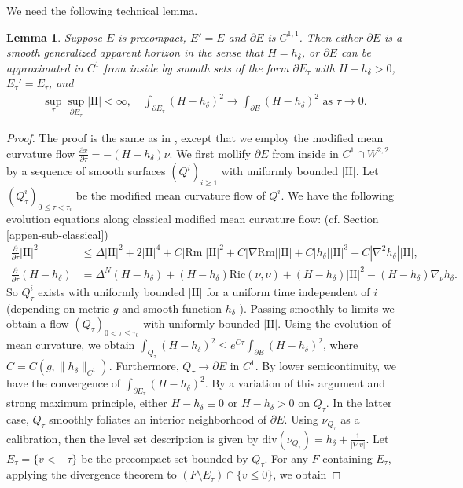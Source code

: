 \documentclass[11pt, letterpaper]{amsart}
\newtheorem{lem}[thm]{Lemma}
\theoremstyle{definition}
\theoremstyle{remark}
\begin{document}
We need the following technical lemma.
\begin{lem}\label{modified-mcf-smoothing}
Suppose $E$ is precompact, $E' = E$ and $\partial E$ is $C^{1,1}$. Then either $\partial E$ is a smooth generalized apparent horizon in the sense that $H= h_{\delta }$, or $\partial E$ can be approximated in $C^1$ from inside by smooth sets of the form $\partial E_{\tau }$ with $H- h_{\delta }>0$, $E_{\tau }' = E_{\tau }$, and
\begin{align*}
	\sup_{\tau } \sup_{\partial E_{\tau }} |\mathrm{II}| < \infty,\quad \int_{\partial E_{\tau }} (H- h_{\delta })^2 \to \int_{\partial E} (H- h_{\delta })^2 \text{ as } \tau \to 0.
\end{align*} 
\end{lem}
\begin{proof}
	The proof is the same as in \cite[Lemma 5.6]{HI01}, except that we employ the modified mean curvature flow $\frac{\partial x}{\partial \tau } = - (H- h_{\delta }) \nu $. We first mollify $\partial E$ from inside in $C^{1}\cap W^{2,2}$ by a sequence of smooth surfaces $(Q^{i})_{i \geq 1}$ with uniformly bounded $|\mathrm{II}|$. Let $(Q ^{i}_{\tau })_{0 \leq \tau < \tau _i}$ be the modified mean curvature flow of $Q^i$.  We have the following evolution equations along classical modified mean curvature flow: (cf. Section \ref{appen-sub-classical})
	\begin{align*}
		\frac{\partial }{\partial \tau }|\mathrm{II}|^2 &\leq \Delta |\mathrm{II}|^2 + 2 |\mathrm{II}|^4 + C |\mathrm{Rm}| |\mathrm{II}|^2 + C |\nabla \mathrm{Rm}| |\mathrm{II}| + C |h_{\delta }| |\mathrm{II}|^3 + C |\nabla ^2 h_{\delta }| |\mathrm{II}|,\\
		\frac{\partial }{\partial  \tau }(H- h_{\delta }) &=  \Delta ^{N} (H- h_{\delta }) + (H- h_{\delta }) \mathrm{Ric}(\nu ,\nu ) + (H- h_{\delta }) |\mathrm{II}|^2 - (H- h_{\delta }) \nabla _{\nu } h_{\delta }.
	\end{align*} 
	So $Q^{i}_{\tau }$ exists with uniformly bounded $|\mathrm{II}|$ for a uniform time independent of $i$ (depending on metric $g$ and smooth function $h_{\delta }$ ). Passing smoothly to limits we obtain a flow $(Q_{\tau })_{0< \tau \leq \tau _0}$ with uniformly bounded $|\mathrm{II}|$. Using the evolution of mean curvature, we obtain $\int_{Q_\tau } (H- h_{\delta })^2 \leq e ^{C \tau } \int_{\partial E} (H- h_{\delta })^2$, where $C = C(g, \|h_{\delta }\|_{C^1})$. Furthermore, $Q_{\tau } \to \partial E$ in $C^1$. By lower semicontinuity, we have the convergence of $\int_{\partial E_{\tau }}(H-h_{\delta })^2 $. By a variation of this argument and strong maximum principle, either $H- h_{\delta } \equiv 0$ or $H- h_{\delta }>0$ on $Q_{\tau }$. In the latter case, $Q_{\tau }$ smoothly foliates an interior neighborhood of $\partial E$. Using $\nu _{Q_\tau }$ as a calibration, then the level set description is given by $\mathrm{div}(\nu_{Q_\tau } ) = h_{\delta } + \frac{1}{|\nabla v|}$. Let $E_{\tau } = \{ v < - \tau \} $ be the precompact set bounded by $Q_{\tau }$. For any $F$ containing $E_{\tau }$, applying the divergence theorem to $(F \setminus E_{\tau }) \cap \{ v \leq 0\} $, we obtain

\end{proof}
\end{document}
